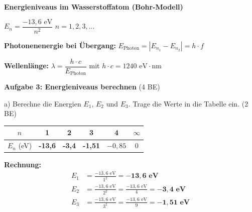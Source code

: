 \documentclass[11pt,a4paper]{article}
\begin{document}
\begin{tcolorbox}[formelbox]
\textbf{Energieniveaus im Wasserstoffatom (Bohr-Modell)}

\vspace{0.5em}

\begin{center}
{\Large $E_n = \dfrac{-13{,}6 \text{ eV}}{n^2}$} \hspace{2cm} $n = 1, 2, 3, ...$
\end{center}

\vspace{0.3em}

\textbf{Photonenenergie bei Übergang:} \hspace{1cm} $E_{\text{Photon}} = |E_{n_1} - E_{n_2}| = h \cdot f$

\vspace{0.3em}

\textbf{Wellenlänge:} \hspace{1cm} $\lambda = \dfrac{h \cdot c}{E_{\text{Photon}}}$ \hspace{1cm} mit $h \cdot c = 1240 \text{ eV} \cdot \text{nm}$
\end{tcolorbox}

\vspace{0.5em}


\textbf{Aufgabe 3: Energieniveaus berechnen} \hfill (4 BE)

\vspace{0.3em}

a) Berechne die Energien $E_1$, $E_2$ und $E_3$. Trage die Werte in die Tabelle ein. (2 BE)

\vspace{0.3em}

\begin{center}
\begin{tabular}{|c|c|c|c|c|c|}
\hline
$n$ & 1 & 2 & 3 & 4 & $\infty$ \\
\hline
$E_n$ (eV) & \textcolor{loesung}{\textbf{-13,6}} & \textcolor{loesung}{\textbf{-3,4}} & \textcolor{loesung}{\textbf{-1,51}} & $-0{,}85$ & 0 \\
\hline
\end{tabular}
\end{center}

\vspace{0.3em}

\begin{tcolorbox}[loesungbox]
\textbf{Rechnung:}
\begin{align*}
E_1 &= \frac{-13{,}6 \text{ eV}}{1^2} = \mathbf{-13{,}6 \text{ eV}} \\[0.3em]
E_2 &= \frac{-13{,}6 \text{ eV}}{2^2} = \frac{-13{,}6 \text{ eV}}{4} = \mathbf{-3{,}4 \text{ eV}} \\[0.3em]
E_3 &= \frac{-13{,}6 \text{ eV}}{3^2} = \frac{-13{,}6 \text{ eV}}{9} = \mathbf{-1{,}51 \text{ eV}}
\end{align*}
\end{tcolorbox}
\end{document}
